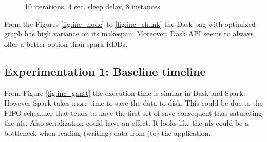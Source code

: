 \documentclass[11pt,a4paper]{article}
\begin{document}
\begin{figure}[htp]
    \centering
    
    \caption{10 iterations, 4 sec. sleep delay, 8 instances}
    \label{fig:inc_splits}
\end{figure}

From the Figures \ref{fig:inc_node} to \ref{fig:inc_chunk} the Dask bag with optimized graph
has high variance on its makespan. Moreover, Dask API seems to always offer a better
option than spark RDDs.

\subsection{Experimentation 1: Baseline timeline}
From Figure \ref{fig:inc_gantt} the execution time
is similar in Dask and Spark. However Spark takes more time to save the data to disk.
This could be due to the FIFO scheduler that tends to have the first set of save
consequent thus saturating the nfs. Also serialization could have an effect. It looks
like the nfs could be a bottleneck when reading (writing) data from (to) the
application.
\end{document}
